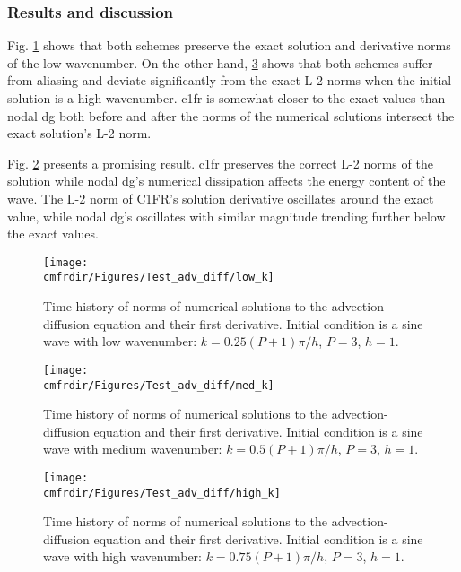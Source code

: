 \subsubsection{Results and discussion}
Fig. \ref{fig:low_wavenumber} shows that both schemes preserve the exact solution and derivative norms of the low wavenumber. On the other hand, \ref{fig:high_wavenumber} shows that both schemes suffer from aliasing and deviate significantly from the exact L-2 norms when the initial solution is a high wavenumber. \gls{c1fr} is somewhat closer to the exact values than nodal \gls{dg} both before and after the norms of the numerical solutions intersect the exact solution's L-2 norm.

Fig. \ref{fig:medium_wavenumber} presents a promising result. \gls{c1fr} preserves the correct L-2 norms of the solution while nodal \gls{dg}'s numerical dissipation affects the energy content of the wave. The L-2 norm of C1FR's solution derivative oscillates around the exact value, while nodal \gls{dg}'s oscillates with similar magnitude trending further below the exact values.


\begin{figure}[h]
\centering\texttt{[image: \\cmfrdir/Figures/Test\_adv\_diff/low\_k]}
\caption{Time history of norms of numerical solutions to the advection-diffusion equation and their first derivative. Initial condition is a sine wave with low wavenumber: $k = 0.25 (P+1)\pi/h$, $P = 3$, $h = 1$.}
\label{fig:low_wavenumber}
\end{figure}

\begin{figure}[h]
\centering\texttt{[image: \\cmfrdir/Figures/Test\_adv\_diff/med\_k]}
\caption{Time history of norms of numerical solutions to the advection-diffusion equation and their first derivative. Initial condition is a sine wave with medium wavenumber: $k = 0.5 (P+1)\pi/h$, $P = 3$, $h = 1$.}
\label{fig:medium_wavenumber}
\end{figure}

\begin{figure}[h]
\centering\texttt{[image: \\cmfrdir/Figures/Test\_adv\_diff/high\_k]}
\caption{Time history of norms of numerical solutions to the advection-diffusion equation and their first derivative. Initial condition is a sine wave with high wavenumber: $k = 0.75 (P+1)\pi/h$, $P = 3$, $h = 1$.}
\label{fig:high_wavenumber}
\end{figure}

